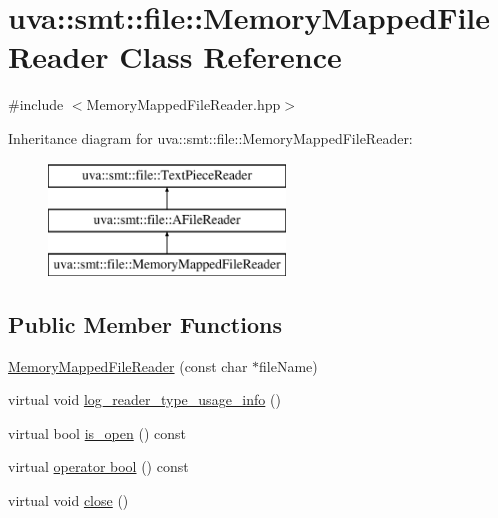 \hypertarget{classuva_1_1smt_1_1file_1_1_memory_mapped_file_reader}{}\section{uva\+:\+:smt\+:\+:file\+:\+:Memory\+Mapped\+File\+Reader Class Reference}
\label{classuva_1_1smt_1_1file_1_1_memory_mapped_file_reader}


{\ttfamily \#include $<$Memory\+Mapped\+File\+Reader.\+hpp$>$}

Inheritance diagram for uva\+:\+:smt\+:\+:file\+:\+:Memory\+Mapped\+File\+Reader\+:\begin{figure}[H]
\begin{center}
\leavevmode
\includegraphics[height=3.000000cm]{classuva_1_1smt_1_1file_1_1_memory_mapped_file_reader}
\end{center}
\end{figure}
\subsection*{Public Member Functions}
\begin{DoxyCompactItemize}
\item 
\hyperlink{classuva_1_1smt_1_1file_1_1_memory_mapped_file_reader_a05f2fe3e1113406e56d01bbabfbd7e75}{Memory\+Mapped\+File\+Reader} (const char $\ast$file\+Name)
\item 
virtual void \hyperlink{classuva_1_1smt_1_1file_1_1_memory_mapped_file_reader_a4b14bb5f729bbfc4f8f4aedd8a229d38}{log\+\_\+reader\+\_\+type\+\_\+usage\+\_\+info} ()
\item 
virtual bool \hyperlink{classuva_1_1smt_1_1file_1_1_memory_mapped_file_reader_adf86f382aa10dc54b020ff1edf2910d5}{is\+\_\+open} () const 
\item 
virtual \hyperlink{classuva_1_1smt_1_1file_1_1_memory_mapped_file_reader_a04b0908eafaf9505f801d8870b6c3d48}{operator bool} () const 
\item 
virtual void \hyperlink{classuva_1_1smt_1_1file_1_1_memory_mapped_file_reader_a65f90d7146848849ec88e42f28819208}{close} ()
\end{DoxyCompactItemize}


